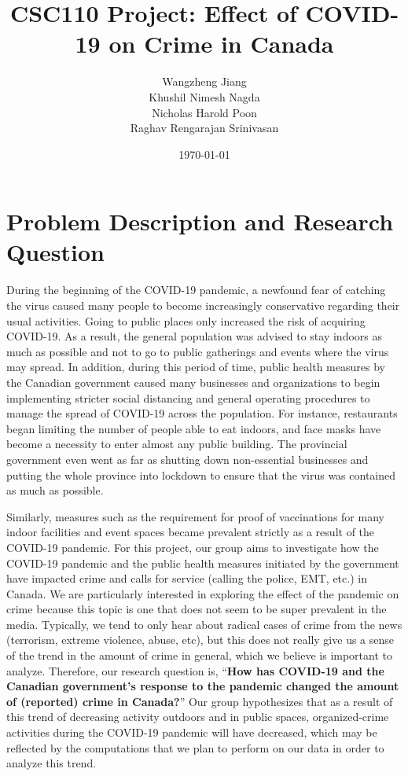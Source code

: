 \documentclass[fontsize=11pt]{article}
\title{CSC110 Project: \textbf{Effect of COVID-19 on Crime in Canada}}
\author{Wangzheng Jiang\\
		Khushil Nimesh Nagda\\
		Nicholas Harold Poon\\
		Raghav Rengarajan Srinivasan}
\date{\today}
\begin{document}
\maketitle
\section{Problem Description and Research Question}
\par
During the beginning of the COVID-19 pandemic, a newfound fear of catching the virus caused many people to become increasingly conservative regarding their usual activities. Going to public places only increased the risk of acquiring COVID-19. As a result, the general population was advised to stay indoors as much as possible and not to go to public gatherings and events where the virus may spread. In addition, during this period of time, public health measures by the Canadian government caused many businesses and organizations to begin implementing stricter social distancing and general operating procedures to manage the spread of COVID-19 across the population. For instance, restaurants began limiting the number of people able to eat indoors, and face masks have become a necessity to enter almost any public building. The provincial government even went as far as shutting down non-essential businesses and putting the whole province into lockdown to ensure that the virus was contained as much as possible.

Similarly, measures such as the requirement for proof of vaccinations for many indoor facilities and event spaces became prevalent strictly as a result of the COVID-19 pandemic. For this project, our group aims to investigate how the COVID-19 pandemic and the public health measures initiated by the government have impacted crime and calls for service (calling the police, EMT, etc.) in Canada. We are particularly interested in exploring the effect of the pandemic on crime because this topic is one that does not seem to be super prevalent in the media. Typically, we tend to only hear about radical cases of crime from the news (terrorism, extreme violence, abuse, etc), but this does not really give us a sense of the trend in the amount of crime in general, which we believe is important to analyze. Therefore, our research question is, “\textbf{How has COVID-19 and the Canadian government’s response to the pandemic changed the amount of (reported) crime in Canada?}” Our group hypothesizes that as a result of this trend of decreasing activity outdoors and in public spaces, organized-crime activities during the COVID-19 pandemic will have decreased, which may be reflected by the computations that we plan to perform on our data in order to analyze this trend.
\end{document}
